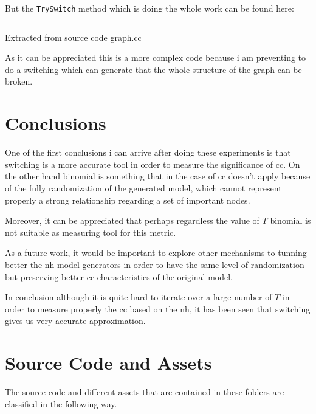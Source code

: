 \documentclass[12pt, a4paper]{article}
\begin{document}
But the \texttt{TrySwitch} method which is doing the whole work can be found here:

\begin{listing}[H]
    \inputminted[firstline=280, lastline=317, breaklines]{cpp}{../src/domain/graph.cc}
    \caption{Extracted from source code graph.cc}
    \label{source:code:6}
\end{listing} 

As it can be appreciated this is a more complex code because i am preventing to do a switching which 
can generate that the whole structure of the graph can be broken.

\section{Conclusions}
One of the first conclusions i can arrive after doing these experiments is that \acrshort{switching} is a more accurate
tool in order to measure the significance of \acrshort{cc}. On the other hand \acrshort{binomial} is something that in the case
of \acrshort{cc} doesn't apply because of the fully randomization of the generated model, which cannot represent properly a strong
relationship regarding a set of important nodes. 

Moreover, it can be appreciated that perhaps regardless the value of $T$ \acrshort{binomial} is not suitable as measuring tool for this
metric.

As a future work, it would be important to explore other mechanisms to tunning better the \acrshort{nh} model generators in order
to have the same level of randomization but preserving better \acrshort{cc} characteristics of the original model.

In conclusion although it is quite hard to iterate over a large number of $T$ in order to measure properly the \acrshort{cc} based on the \acrshort{nh},
it has been seen that \acrshort{switching} gives us very accurate approximation.

\printglossary[type=\acronymtype]

\appendix\label{apx:org}
\section{Source Code and Assets}
The source code and different assets that are contained in these folders are classified in the following way.
\end{document}
